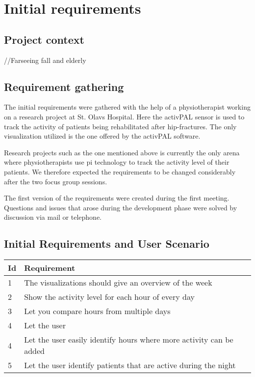 \chapter{Initial requirements}

\section{Project context}
//Farseeing fall and elderly


\section{Requirement gathering}
The initial requirements were gathered with the help of a physiotherapist working on a research project at St. Olavs Hospital. Here the activPAL sensor is used to track the activity of patients being rehabilitated after hip-fractures. The only visualization utilized is the one offered by the activPAL software.

Research projects such as the one mentioned above is currently the only arena where physiotherapists use \gls{pi} technology to track the activity level of their patients. We therefore expected the requirements to be changed considerably after the two focus group sessions. 

The first version of the requirements were created during the first meeting. Questions and issues that arose during the development phase were solved by discussion via mail or telephone.

\section{Initial Requirements and User Scenario}
\begin{table}[h!]
  \begin{center}
  \begin{tabular}{|l|p{12cm}|}
    \hline
      \textbf{Id} & \textbf{Requirement} \\ \hline
      1 & The visualizations should give an overview of the week \\ \hline
      2 & Show the activity level for each hour of every day \\ \hline
      3 & Let you compare hours from multiple days \\ \hline
      4 & Let the user  \\ \hline
      4 & Let the user easily identify hours where more activity can be added \\ \hline
      5 & Let the user identify patients that are active during the night \\ \hline
  \end{tabular}
  \end{center}
\end{table}
 
